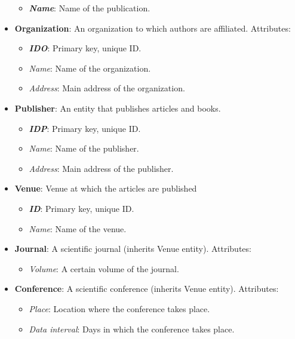 \documentclass{Configuration_Files/PoliMi3i_thesis}
\begin{document}
\begin{itemize}
\begin{itemize}
      \item \textit{\textbf{Name}}: Name of the publication. 
\end{itemize}
\item \textbf{Organization}: An organization to which authors are affiliated. Attributes:
\begin{itemize}
      \item \textit{\textbf{IDO}}: Primary key, unique ID.
      \item \textit{Name}: Name of the organization.
      \item \textit{Address}: Main address of the organization.
\end{itemize}
\item \textbf{Publisher}: An entity that publishes articles and books.
\begin{itemize}
      \item \textit{\textbf{IDP}}: Primary key, unique ID.
      \item \textit{Name}: Name of the publisher. 
      \item \textit{Address}: Main address of the publisher.
\end{itemize}
\item \textbf {Venue}: Venue at which the articles are published 
\begin{itemize}
      \item\textit{\textbf{ID}}: Primary key, unique ID.
      \item \textit{Name}: Name of the venue. 
    \end{itemize}

\item \textbf {Journal}: A scientific journal (inherits Venue entity). Attributes:
\begin{itemize}
     \item \textit{Volume}: A certain volume of the journal.
\end{itemize}
\item \textbf {Conference}: A scientific conference (inherits Venue entity). Attributes:
\begin{itemize}
      \item \textit{Place}: Location where the conference takes place.
      \item \textit{Data interval}: Days in which the conference takes place.
    \end{itemize}
\end{itemize}
\end{document}
